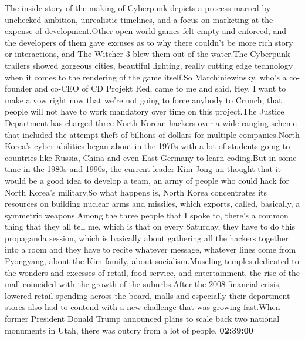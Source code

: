 \documentclass{article}%
\begin{document}
The inside story of the making of Cyberpunk depicts a process marred by unchecked ambition, unrealistic timelines, and a focus on marketing at the expense of development.Other open world games felt empty and enforced, and the developers of them gave excuses as to why there couldn't be more rich story or interactions, and The Witcher 3 blew them out of the water.The Cyberpunk trailers showed gorgeous cities, beautiful lighting, really cutting edge technology when it comes to the rendering of the game itself.So Marchiniewinsky, who's a co{-}founder and co{-}CEO of CD Projekt Red, came to me and said, Hey, I want to make a vow right now that we're not going to force anybody to Crunch, that people will not have to work mandatory over time on this project.The Justice Department has charged three North Korean hackers over a wide ranging scheme that included the attempt theft of billions of dollars for multiple companies.North Korea's cyber abilities began about in the 1970s with a lot of students going to countries like Russia, China and even East Germany to learn coding.But in some time in the 1980s and 1990s, the current leader Kim Jong{-}un thought that it would be a good idea to develop a team, an army of people who could hack for North Korea's military.So what happens is, North Korea concentrates its resources on building nuclear arms and missiles, which exports, called, basically, a symmetric weapons.Among the three people that I spoke to, there's a common thing that they all tell me, which is that on every Saturday, they have to do this propaganda session, which is basically about gathering all the hackers together into a room and they have to recite whatever message, whatever lines come from Pyongyang, about the Kim family, about socialism.Muscling temples dedicated to the wonders and excesses of retail, food service, and entertainment, the rise of the mall coincided with the growth of the suburbs.After the 2008 financial crisis, lowered retail spending across the board, malls and especially their department stores also had to contend with a new challenge that was growing fast.When former President Donald Trump announced plans to scale back two national monuments in Utah, there was outcry from a lot of people.%
\textbf{02:39:00}%
\newline%
\end{document}

